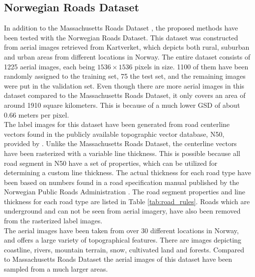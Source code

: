 
\subsection{Norwegian Roads Dataset}
In addition to the Massachusetts Roads Dataset \citep{MnihThesis}, the proposed methods have been tested with the Norwegian Roads Dataset. This dataset was constructed from aerial images retrieved from Kartverket, which depicts both rural, suburban and urban areas from different locations in Norway. The entire dataset consists of 1225 aerial images, each being $1536\times 1536$ pixels in size. 1100 of them have been randomly assigned to the training set, 75 the test set, and the remaining images were put in the validation set. Even though there are more aerial images in this dataset compared to the Massachusetts Roads Dataset, it only covers an area of around 1910 square kilometers. This is because of a much lower \ac{GSD} of about 0.66 meters per pixel. \\


The label images for this dataset have been generated from road centerline vectors found in the publicly available topographic vector database, N50, provided by \cite{Kartverket}. Unlike the Massachusetts Roads Dataset, the centerline vectors have been rasterized with a variable line thickness. This is possible because all road segment in N50 have a set of properties, which can be utilized for determining a custom line thickness. The actual thickness for each road type have been based on numbers found in a road specification manual published by the Norwegian Public Roads Administration \citep{Norwegian_road_manual}. The road segment properties and line thickness for each road type are listed in Table \ref{tab:road_rules}. Roads which are underground and can not be seen from aerial imagery, have also been removed from the rasterized label images.\\

The aerial images have been taken from over 30 different locations in Norway, and offers a large variety of topographical features. There are images depicting coastline, rivers, mountain terrain, snow, cultivated land and forests. Compared to Massachusetts Roads Dataset the aerial images of this dataset have been sampled from a much larger areas. \\


